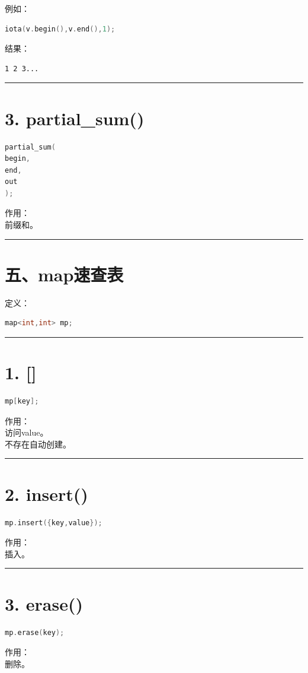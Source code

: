 \documentclass[9pt,twocolumn]{extarticle}
\begin{document}
例如：
\begin{lstlisting}[language=C++]
iota(v.begin(),v.end(),1);
\end{lstlisting}
结果：
\begin{lstlisting}
1 2 3...
\end{lstlisting}

\noindent\rule{\linewidth}{0.4pt}

\section{3. partial\_sum()}
\begin{lstlisting}[language=C++]
partial_sum(
begin,
end,
out
);
\end{lstlisting}
作用：\\
前缀和。

\noindent\rule{\linewidth}{0.4pt}

\section{五、map速查表}

定义：
\begin{lstlisting}[language=C++]
map<int,int> mp;
\end{lstlisting}

\noindent\rule{\linewidth}{0.4pt}

\section{1. []}
\begin{lstlisting}[language=C++]
mp[key];
\end{lstlisting}
作用：\\
访问value。\\
不存在自动创建。

\noindent\rule{\linewidth}{0.4pt}

\section{2. insert()}
\begin{lstlisting}[language=C++]
mp.insert({key,value});
\end{lstlisting}
作用：\\
插入。

\noindent\rule{\linewidth}{0.4pt}

\section{3. erase()}
\begin{lstlisting}[language=C++]
mp.erase(key);
\end{lstlisting}
作用：\\
删除。
\end{document}
